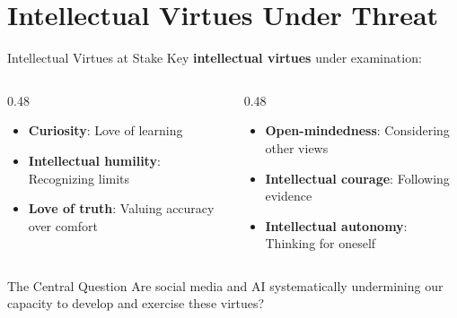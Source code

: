 \documentclass[aspectratio=169]{beamer}
\begin{document}
\section{Intellectual Virtues Under Threat}


\begin{frame}{Intellectual Virtues at Stake}
Key \textbf{intellectual virtues} under examination:

\begin{columns}[T]
\begin{column}{0.48\textwidth}
\begin{itemize}
    \item \textbf{Curiosity}: Love of learning
    \item \textbf{Intellectual humility}: Recognizing limits
    \item \textbf{Love of truth}: Valuing accuracy over comfort
\end{itemize}
\end{column}
\begin{column}{0.48\textwidth}
\begin{itemize}
    \item \textbf{Open-mindedness}: Considering other views
    \item \textbf{Intellectual courage}: Following evidence
    \item \textbf{Intellectual autonomy}: Thinking for oneself
\end{itemize}
\end{column}
\end{columns}

\vspace{0.5cm}
\begin{alertblock}{The Central Question}
Are social media and AI systematically undermining our capacity to develop and exercise these virtues?
\end{alertblock}
\end{frame}
\end{document}
